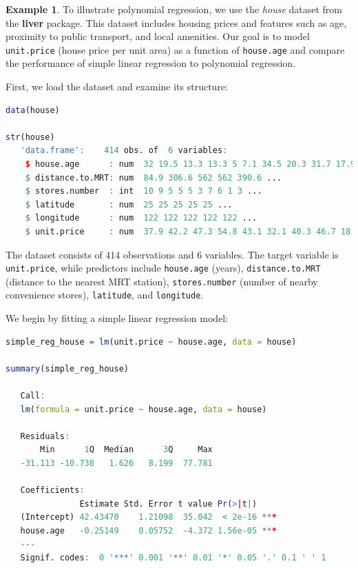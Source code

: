 \documentclass[
]{book}
\newcommand{\passthrough}[1]{#1}
\theoremstyle{definition}
\theoremstyle{definition}
\newtheorem{example}{Example}[chapter]
\theoremstyle{definition}
\theoremstyle{definition}
\theoremstyle{remark}
\begin{document}
\begin{example}
\protect\hypertarget{exm:ex-polynomial-regression}{}\label{exm:ex-polynomial-regression}To illustrate polynomial regression, we use the \emph{house} dataset from the \textbf{liver} package. This dataset includes housing prices and features such as age, proximity to public transport, and local amenities. Our goal is to model \passthrough{\lstinline!unit.price!} (house price per unit area) as a function of \passthrough{\lstinline!house.age!} and compare the performance of simple linear regression to polynomial regression.

First, we load the dataset and examine its structure:

\begin{lstlisting}[language=R]
data(house)

str(house)
   'data.frame':    414 obs. of  6 variables:
    $ house.age      : num  32 19.5 13.3 13.3 5 7.1 34.5 20.3 31.7 17.9 ...
    $ distance.to.MRT: num  84.9 306.6 562 562 390.6 ...
    $ stores.number  : int  10 9 5 5 5 3 7 6 1 3 ...
    $ latitude       : num  25 25 25 25 25 ...
    $ longitude      : num  122 122 122 122 122 ...
    $ unit.price     : num  37.9 42.2 47.3 54.8 43.1 32.1 40.3 46.7 18.8 22.1 ...
\end{lstlisting}

The dataset consists of 414 observations and 6 variables. The target variable is \passthrough{\lstinline!unit.price!}, while predictors include \passthrough{\lstinline!house.age!} (years), \passthrough{\lstinline!distance.to.MRT!} (distance to the nearest MRT station), \passthrough{\lstinline!stores.number!} (number of nearby convenience stores), \passthrough{\lstinline!latitude!}, and \passthrough{\lstinline!longitude!}.

We begin by fitting a simple linear regression model:

\begin{lstlisting}[language=R]
simple_reg_house = lm(unit.price ~ house.age, data = house)

summary(simple_reg_house)
   
   Call:
   lm(formula = unit.price ~ house.age, data = house)
   
   Residuals:
       Min      1Q  Median      3Q     Max 
   -31.113 -10.738   1.626   8.199  77.781 
   
   Coefficients:
               Estimate Std. Error t value Pr(>|t|)    
   (Intercept) 42.43470    1.21098  35.042  < 2e-16 ***
   house.age   -0.25149    0.05752  -4.372 1.56e-05 ***
   ---
   Signif. codes:  0 '***' 0.001 '**' 0.01 '*' 0.05 '.' 0.1 ' ' 1
   

\end{lstlisting}
\end{example}
\end{document}
